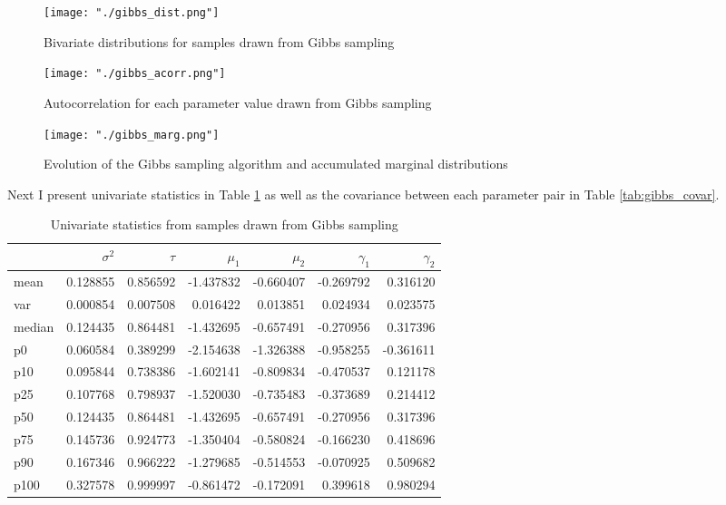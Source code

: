 \documentclass{article}
\begin{document}
\begin{figure}[H]
  \centering
  \texttt{[image: "./gibbs\_dist.png"]}
  \caption{\label{fig:mh_dist} Bivariate distributions for samples drawn from Gibbs sampling}
\end{figure}

\begin{figure}[H]
  \centering
  \texttt{[image: "./gibbs\_acorr.png"]}
  \caption{\label{fig:mh_acorr} Autocorrelation for each parameter value drawn from Gibbs sampling}
\end{figure}

\begin{figure}[H]
  \centering
  \texttt{[image: "./gibbs\_marg.png"]}
  \caption{\label{fig:mh_marg} Evolution of the Gibbs sampling algorithm and accumulated marginal distributions}
\end{figure}

Next I present univariate statistics in Table \ref{tab:gibbs_univar} as well as the covariance between each parameter pair in Table \ref{tab:gibbs_covar}. 

\begin{table}[H]
  \begin{center}
    \begin{tabular}{lrrrrrr}
      &$\sigma^2$ & $\tau$ & $\mu_1$ & $\mu_2$ & $\gamma_1$ & $\gamma_2$ \\
      \midrule
      mean   &  0.128855 &  0.856592 & -1.437832 & -0.660407 & -0.269792 &  0.316120 \\
      var    &  0.000854 &  0.007508 &  0.016422 &  0.013851 &  0.024934 &  0.023575 \\
      median &  0.124435 &  0.864481 & -1.432695 & -0.657491 & -0.270956 &  0.317396 \\
      p0     &  0.060584 &  0.389299 & -2.154638 & -1.326388 & -0.958255 & -0.361611 \\
      p10    &  0.095844 &  0.738386 & -1.602141 & -0.809834 & -0.470537 &  0.121178 \\
      p25    &  0.107768 &  0.798937 & -1.520030 & -0.735483 & -0.373689 &  0.214412 \\
      p50    &  0.124435 &  0.864481 & -1.432695 & -0.657491 & -0.270956 &  0.317396 \\
      p75    &  0.145736 &  0.924773 & -1.350404 & -0.580824 & -0.166230 &  0.418696 \\
      p90    &  0.167346 &  0.966222 & -1.279685 & -0.514553 & -0.070925 &  0.509682 \\
      p100   &  0.327578 &  0.999997 & -0.861472 & -0.172091 &  0.399618 &  0.980294 \\
      \bottomrule
      \end{tabular}
  \end{center}
  \caption{\label{tab:gibbs_univar} Univariate statistics from samples drawn from Gibbs sampling}
\end{table}
\end{document}
